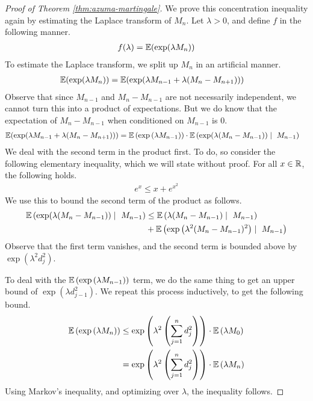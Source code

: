 \documentclass[11pt]{article}
\begin{document}
\begin{proof}[Proof of Theorem \ref{thm:azuma-martingale}]
  We prove this concentration inequality again by estimating the Laplace transform of $M_n$.
  Let $\lambda > 0$, and define $f$ in the following manner.
  \begin{align*}
    f(\lambda) = \mathbb{E}(\exp(\lambda M_n))
  \end{align*}
  To estimate the Laplace transform, we split up $M_n$ in an artificial manner.
  \begin{align*}
    \mathbb{E}(\exp(\lambda M_n))
    &= \mathbb{E}(\exp(\lambda M_{n-1} + \lambda(M_n - M_{n+1})))
  \end{align*}
  Observe that since $M_{n-1}$ and $M_n - M_{n-1}$ are not necessarily independent, we cannot turn this into a product of expectations.
  But we do know that the expectation of $M_{n} - M_{n-1}$ when conditioned on $M_{n-1}$ is $0$.
  \begin{align*}
    \mathbb{E}(\exp(\lambda M_{n-1} + \lambda(M_n - M_{n+1})))
    &= \mathbb{E}\left( \exp\left( \lambda M_{n-1} \right)  \right)
      \cdot \mathbb{E}\left( \exp(\lambda (M_n - M_{n-1})) \mid\ M_{n-1} \right)
  \end{align*}
  We deal with the second term in the product first.
  To do, so consider the following elementary inequality, which we will state without proof.
  For all $x \in \mathbb{R}$, the following holds.
  \begin{align*}
    e^x \leq x + e^{x^2}
  \end{align*}
  We use this to bound the second term of the product as follows.
  \begin{align*}
    \mathbb{E}\left( \exp(\lambda (M_n - M_{n-1})) \mid\ M_{n-1} \right)
    &\leq \mathbb{E}\left( \lambda(M_n - M_{n-1}) \mid\ M_{n-1} \right) \\
      &+ \mathbb{E}\left( \exp\left( \lambda^2(M_n - M_{n-1})^2 \right) \mid\ M_{n-1} \right)
  \end{align*}
  Observe that the first term vanishes, and the second term is bounded above by $\exp(\lambda^2 d_j^2)$.

  To deal with the $\mathbb{E}\left( \exp\left( \lambda M_{n-1} \right) \right)$ term, we do the same thing to get an upper bound of $\exp(\lambda d_{j-1}^2)$.
  We repeat this process inductively, to get the following bound.
  \begin{align*}
    \mathbb{E}\left( \exp\left( \lambda M_n \right) \right)
    &\leq \exp\left( \lambda^2 \left( \sum_{j=1}^n d_j^2 \right) \right) \cdot \mathbb{E}\left( \lambda M_0 \right) \\
    &= \exp\left( \lambda^2 \left( \sum_{j=1}^n d_j^2 \right) \right) \cdot \mathbb{E}\left( \lambda M_n \right)
  \end{align*}
  Using Markov's inequality, and optimizing over $\lambda$, the inequality follows.
\end{proof}
\end{document}
